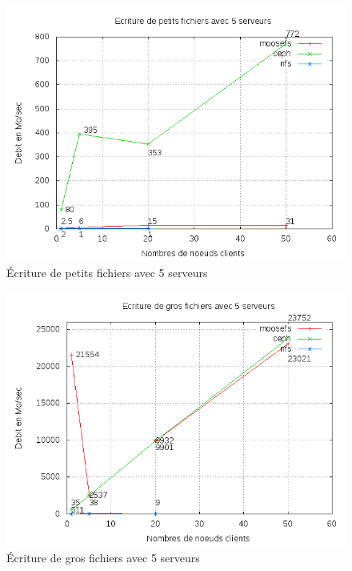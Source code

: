\documentclass[12pt]{report}
\begin{document}
\begin{figure}[H]
\begin{center}
\includegraphics[bb=0 0 640 480,width=12cm]{images/srv5ws2.png}
\caption{Écriture de petits fichiers avec 5 serveurs}
\end{center}
\end{figure} 
\begin{figure}[H]
\begin{center}
\includegraphics[bb=0 0 640 480,width=12cm]{images/srv5wb2.png}
\caption{Écriture de gros fichiers avec 5 serveurs}
\end{center}
\end{figure} 
\end{document}
